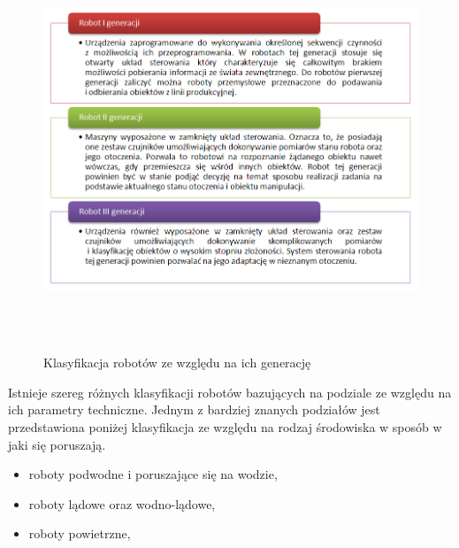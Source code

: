 \begin{figure}[h!]
 \centering \includegraphics[height=120mm]{../images/ch01/robot_generations.png}
 \caption{Klasyfikacja robotów ze względu na ich generację}
 \label{fig:RobotsGenerations}
\end{figure}

Istnieje szereg różnych klasyfikacji robotów bazujących na podziale ze względu na
ich parametry techniczne. Jednym z bardziej znanych podziałów jest przedstawiona
poniżej klasyfikacja ze względu na rodzaj środowiska w sposób w jaki się
poruszają.
\begin{itemize}
  \item roboty podwodne i poruszające się na wodzie,
  \item roboty lądowe oraz wodno-lądowe,
  \item roboty powietrzne,
\end{itemize}


